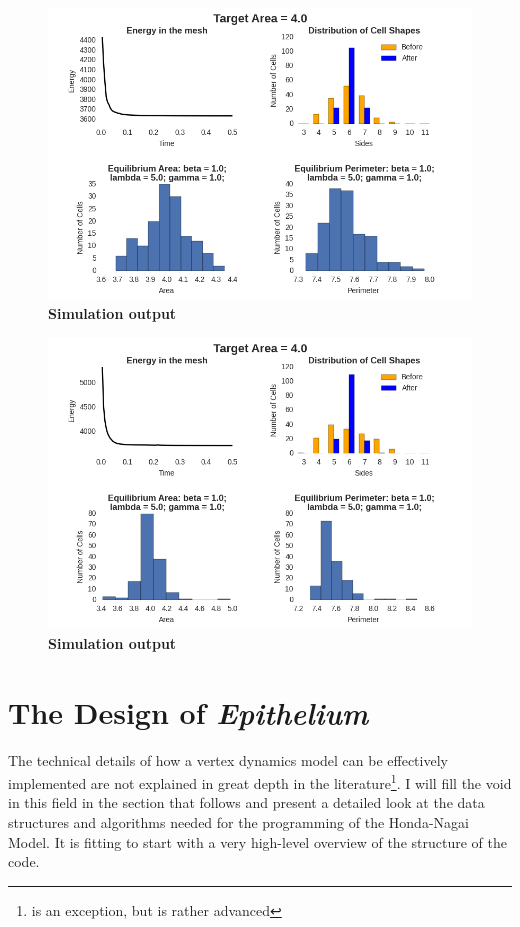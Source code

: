 \begin{figure}
\centering
\includegraphics[height=0.4\textheight]{../diagrams/graphs2.png}
\caption{\textbf{Simulation output}}
\label{fig:g2}
\end{figure}

\begin{figure}
\centering
\includegraphics[height=0.4\textheight]{../diagrams/graphs3.png}
\caption{\textbf{Simulation output}}
\label{fig:g3}
\end{figure}

\section{The Design of \emph{Epithelium}}
The technical details of how a vertex dynamics model can be effectively implemented are not explained in great depth in the literature\footnote{\cite{ChasteMain} is an exception, but is rather advanced}. I will fill the void in this field in the section that follows and present a detailed look at the data structures and algorithms needed for the programming of the Honda-Nagai Model. It is fitting to start with a very high-level overview of the structure of the code.

